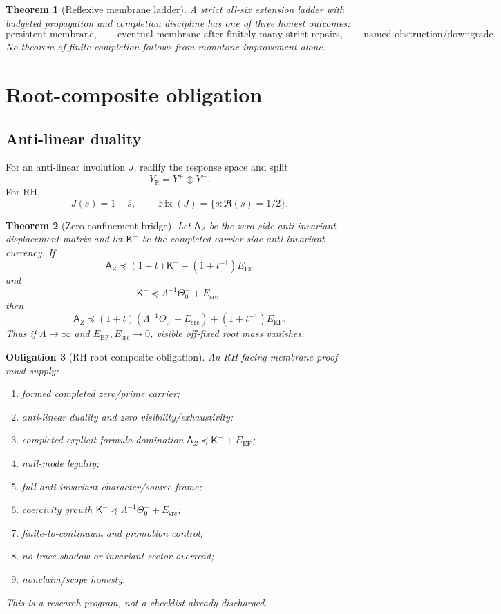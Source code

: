 \documentclass[11pt]{article}
\newtheorem{theorem}{Theorem}[section]
\newtheorem{obligation}[theorem]{Obligation}
\DeclareMathOperator{\Fix}{Fix}
\newcommand{\EF}{\mathrm{EF}}
\newcommand{\src}{\mathrm{src}}
\newcommand{\Loewner}{\preceq}
\begin{document}
\begin{theorem}[Reflexive membrane ladder]
A strict all-six extension ladder with budgeted propagation and completion discipline has one of three honest outcomes:
\[
\text{persistent membrane},\qquad
\text{eventual membrane after finitely many strict repairs},\qquad
\text{named obstruction/downgrade}.
\]
No theorem of finite completion follows from monotone improvement alone.
\end{theorem}

\section{Root-composite obligation}

\subsection{Anti-linear duality}
For an anti-linear involution \(J\), realify the response space and split
\[
  Y_{\mathbb R}=Y^+\oplus Y^-.
\]
For RH,
\[
  J(s)=1-\overline s,
  \qquad
  \Fix(J)=\{s:\Re(s)=1/2\}.
\]

\begin{theorem}[Zero-confinement bridge]
Let \(\mathsf A_Z\) be the zero-side anti-invariant displacement matrix and let \(\mathsf K^-\) be the completed carrier-side anti-invariant currency.  If
\[
  \mathsf A_Z\Loewner(1+t)\mathsf K^-+(1+t^{-1})E_{\EF}
\]
and
\[
  \mathsf K^-\Loewner\Lambda^{-1}\Theta_0^-+E_{\src},
\]
then
\[
  \mathsf A_Z\Loewner(1+t)(\Lambda^{-1}\Theta_0^-+E_{\src})+(1+t^{-1})E_{\EF}.
\]
Thus if \(\Lambda\to\infty\) and \(E_{\EF},E_{\src}\to0\), visible off-fixed root mass vanishes.
\end{theorem}

\begin{obligation}[RH root-composite obligation]
An RH-facing membrane proof must supply:
\begin{enumerate}[label=O\arabic*.,leftmargin=2em]
  \item formed completed zero/prime carrier;
  \item anti-linear duality and zero visibility/exhaustivity;
  \item completed explicit-formula domination \(\mathsf A_Z\Loewner\mathsf K^-+E_{\EF}\);
  \item null-mode legality;
  \item full anti-invariant character/source frame;
  \item coercivity growth \(\mathsf K^-\Loewner\Lambda^{-1}\Theta_0^-+E_{\src}\);
  \item finite-to-continuum and promotion control;
  \item no trace-shadow or invariant-sector overread;
  \item nonclaim/scope honesty.
\end{enumerate}
This is a research program, not a checklist already discharged.
\end{obligation}
\end{document}
